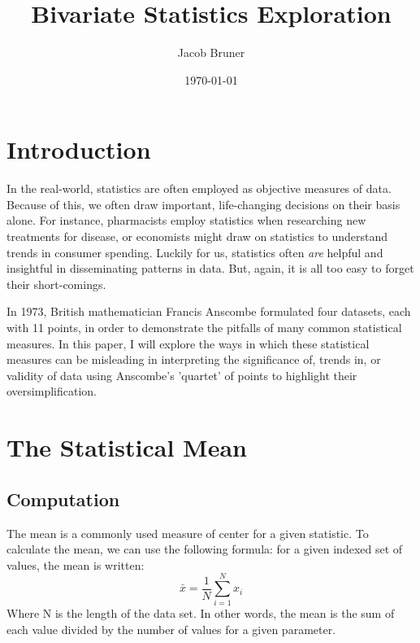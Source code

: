 \documentclass[11pt,a4paper]{article}
\author{Jacob Bruner}
\title{Bivariate Statistics Exploration}
\date{\today}
\begin{document}
\maketitle

\section{Introduction}

In the real-world, statistics are often employed as objective measures of data. Because of this, we often draw important, life-changing decisions on their basis alone. For instance, pharmacists employ statistics when researching new treatments for disease, or economists might draw on statistics to understand trends in consumer spending. Luckily for us, statistics often \textit{are} helpful and insightful in disseminating patterns in data. But, again, it is all too easy to forget their short-comings.

In 1973, British mathematician Francis Anscombe formulated four datasets, each with 11 points, in order to demonstrate the pitfalls of many common statistical measures. In this paper, I will explore the ways in which these statistical measures can be misleading in interpreting the significance of, trends in, or validity of data using Anscombe's 'quartet' of points to highlight their oversimplification.

\section{The Statistical Mean}
\subsection{Computation}
The mean is a commonly used measure of center for a given statistic. To calculate the mean, we can use the following formula: for a given indexed set of values, the mean is written:
\[
\bar{x} = \frac{1}{N} \sum_{i = 1}^{N} x_i
\]
Where N is the length of the data set. In other words, the mean is the sum of each value divided by the number of values for a given parameter. \\
\end{document}
